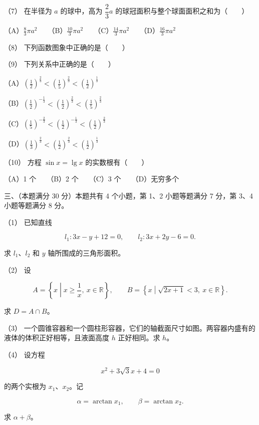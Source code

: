 \begin{question}
（7） 在半径为 $a$ 的球中，高为 $\dfrac23a$ 的球冠面积与整个球面面积之和为\mbox{（　　）}

（A）$\frac83\pi a^2$　　（B）$\frac{10}3\pi a^2$　　（C）$\frac{14}3\pi a^2$　　（D）$\frac{16}3\pi a^2$

（8） 下列函数图象中正确的是\mbox{（　　）}
\nopagebreak[4]
\begin{center}\end{center}
\nopagebreak[4]
（9） 下列关系中正确的是\mbox{（　　）}

（A）$\left(\frac12\right)^{\frac23}<\left(\frac15\right)^{\frac23}<\left(\frac12\right)^{\frac13}$

（B）$\left(\frac12\right)^{-\frac13}<\left(\frac12\right)^{\frac23}<\left(\frac15\right)^{\frac23}$

（C）$\left(\frac15\right)^{-\frac23}<\left(\frac12\right)^{-\frac13}<\left(\frac12\right)^{\frac23}$

（D）$\left(\frac13\right)^{\frac23}<\left(\frac12\right)^{\frac23}<\left(\frac12\right)^{\frac13}$

（10） 方程 $\sin x=\lg x$ 的实数根有\mbox{（　　）}

（A）1 个　　（B）2 个　　（C）3 个　　（D）无穷多个

\Needspace{0.4\textheight}
\end{question}
\begin{question}

三、（本题满分 30 分）本题共有 4 个小题，第 1、2 小题等题满分 7 分，第 3、4 小题等题满分 8 分。

（1） 已知直线

\nopagebreak[4]
\[
l_1:3x-y+12=0,\qquad l_2:3x+2y-6=0.
\]

求 $l_1$、$l_2$ 和 $y$ 轴所围成的三角形面积。

（2） 设

\nopagebreak[4]
\[
A=\left\{x\mathrel{}\middle|\mathrel{}x\ge\frac1x,\ x\in\mathbb R\right\},
\qquad
B=\left\{x\mathrel{}\middle|\mathrel{}\sqrt{2x+1}<3,\ x\in\mathbb R\right\}.
\]

求 $D=A\cap B$。

（3） 一个圆锥容器和一个圆柱形容器，它们的轴截面尺寸如图。两容器内盛有的液体的体积正好相等，且液面高度 $h$ 正好相同。求 $h$。
\nopagebreak[4]
\begin{center}\end{center}
\nopagebreak[4]
（4） 设方程

\nopagebreak[4]
\[
x^2+3\sqrt3x+4=0
\]

的两个实根为 $x_1\text{、}x_2$。记

\nopagebreak[4]
\[
\alpha=\arctan x_1,\qquad \beta=\arctan x_2.
\]

求 $\alpha+\beta$。

\end{question}

